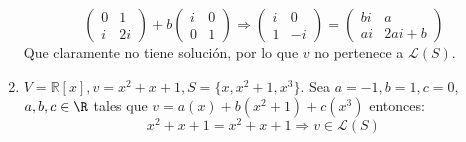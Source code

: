 \begin{ejercicio}
\begin{enumerate}[label=\alph*)]
\begin{equation*}
\begin{pmatrix}
				      0 & 1  \\
				      i & 2i
			      \end{pmatrix} + b\begin{pmatrix}
				      i & 0 \\
				      0 & 1
			      \end{pmatrix}
			      \Rightarrow
			      \begin{pmatrix}
				      i & 0  \\
				      1 & -i
			      \end{pmatrix} = \begin{pmatrix}
				      bi & a       \\
				      ai & 2ai + b
			      \end{pmatrix}
		      \end{equation*}
		      Que claramente no tiene solución, por lo que \( v \) no pertenece a \( \mathcal{L}(S) \).
		\item \( V = \mathbb{R}[x], v = x^2 + x + 1, S = \{x, x^2 + 1, x^3\} \).
		      Sea $a = -1, b = 1, c = 0$, $a,b,c \in \R$ tales que $v = a(x) + b(x^2 + 1) + c(x^3)$ entonces:
		      \begin{equation*}
			      x^2 + x + 1 = x^2 + x + 1 \Rightarrow v \in \mathcal{L}(S)
		      \end{equation*}
	\end{enumerate}
\end{ejercicio}



